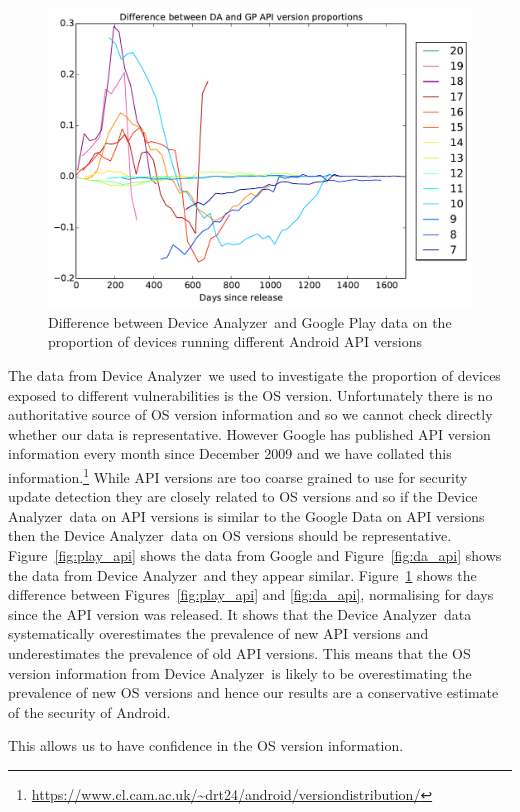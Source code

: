 \documentclass[conference,a4paper,twoside]{IEEEtran}
\let\OldTodo\todo
\renewcommand{\todo}{\OldTodo[inline]}
\newcommand{\todolater}[1]{}%
\newcommand{\da}{Device Analyzer}
\begin{document}
\begin{figure}
 \centering
 \includegraphics[width=\columnwidth]{figures/api_gpcomp_rdiff}
 \caption{Difference between \da\ and Google Play data on the proportion of devices running different Android API versions}
 \label{fig:da_gp_comp_diff}
\end{figure}
The data from \da\ we used to investigate the proportion of devices exposed to different vulnerabilities is the OS version.
Unfortunately there is no authoritative source of OS version information and so we cannot check directly whether our data is representative.
However Google has published API version information every month since December 2009 and we have collated this information.\footnote{\url{https://www.cl.cam.ac.uk/~drt24/android/versiondistribution/}}
While API versions are too coarse grained to use for security update detection they are closely related to OS versions and so if the \da\ data on API versions is similar to the Google Data on API versions then the \da\ data on OS versions should be representative.
Figure~\ref{fig:play_api} shows the data from Google and Figure~\ref{fig:da_api} shows the data from \da\ and they appear similar.
Figure~\ref{fig:da_gp_comp_diff} shows the difference between Figures~\ref{fig:play_api} and \ref{fig:da_api}, normalising for days since the API version was released.
It shows that the \da\ data systematically overestimates the prevalence of new API versions and underestimates the prevalence of old API versions.
This means that the OS version information from \da\ is likely to be overestimating the prevalence of new OS versions and hence our results are a conservative estimate of the security of Android.
\todolater{we want a statistical metric to claim this strongly with.}
This allows us to have confidence in the OS version information.
\end{document}
